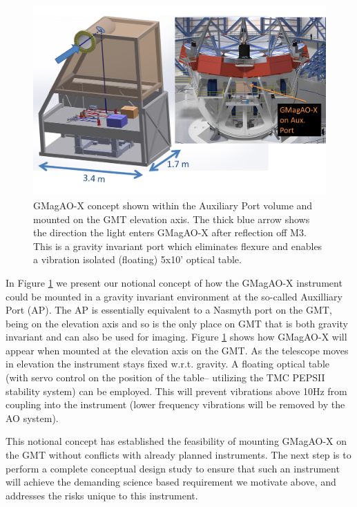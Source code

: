 \documentclass[12pt,preprint]{aastex}
\begin{document}
\begin{figure}[h!]
\centering
\includegraphics[width=6in]{figures/GMagAOX__fig4_no_labels_V2.png}
\caption{ GMagAO-X concept shown within the Auxiliary Port volume and mounted on the GMT elevation axis. The thick blue arrow shows the direction the light enters GMagAO-X after reflection off M3. This is a gravity invariant port which eliminates flexure and enables a vibration isolated (floating) 5x10' optical table. \label{fig:ap}}
\end{figure}

In Figure \ref{fig:ap} we present our notional concept of how the GMagAO-X instrument could be mounted in a gravity invariant environment at the so-called Auxilliary Port (AP). The AP is essentially equivalent to a Nasmyth port on the GMT, being on the elevation axis and so is the only place on GMT that is both gravity invariant and can also be used for imaging.  Figure \ref{fig:ap} shows how GMagAO-X will appear when mounted at the elevation axis on the GMT. As the telescope moves in elevation the instrument stays fixed w.r.t. gravity. A floating optical table (with servo control on the position of the table-- utilizing the TMC PEPSII stability system) can be employed.  This will prevent vibrations above 10Hz from coupling into the instrument (lower frequency vibrations will be removed by the AO system). 

This notional concept has established the feasibility of mounting GMagAO-X on the GMT without conflicts with already planned instruments.  The next step is to perform a complete conceptual design study to ensure that such an instrument will achieve the demanding science based requirement we motivate above, and addresses the risks unique to this instrument. 
\end{document}
